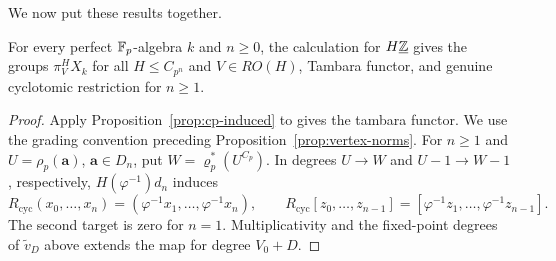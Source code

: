 We now put these results together.

\begin{theorem}\label{thm:cp-result}
For every perfect $\mathbb F_p$-algebra $k$ and $n\ge0$, the calculation for
$H\underline{\mathbb Z}$ gives the groups $\pi_V^H X_k$ for all $H\le C_{p^n}$
and $V\in RO(H)$, Tambara functor, and genuine
cyclotomic restriction for $n\ge1$.
\end{theorem}
\begin{proof}
Apply Proposition~\ref{prop:cp-induced} to \cite[Theorems~1.1
and~1.4; (2.7), (5.5), (8.12)--(8.14), (8.28) and (8.31)--(8.34)]{ZhangHZ} gives the tambara functor.
We use the grading convention preceding
Proposition~\ref{prop:vertex-norms}.
For $n\ge1$ and $U=\rho_p(\mathbf a)$, $\mathbf a\in D_n$, put
$W=\varrho_p^*(U^{C_p})$. In degrees
$U\to W$ and $U-1\to W-1$, respectively, $H(\varphi^{-1})d_n$ induces
\[
 R_{\mathrm{cyc}}(x_0,\ldots,x_n)=(\varphi^{-1}x_1,\ldots,\varphi^{-1}x_n),
 \qquad R_{\mathrm{cyc}}[z_0,\ldots,z_{n-1}]=
 [\varphi^{-1}z_1,\ldots,\varphi^{-1}z_{n-1}].
\]
The second target is zero for $n=1$. Multiplicativity and the
fixed-point degrees of $\widetilde v_D$ above extends the map for degree $V_0+D$.
\end{proof}
